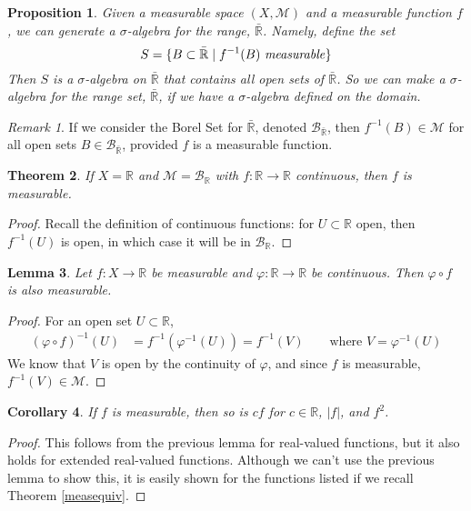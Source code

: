 \documentclass[12pt]{article}
\theoremstyle{plain}
\newtheorem{thm}{Theorem}[subsection]
\newtheorem{lem}[thm]{Lemma}
\newtheorem{prop}[thm]{Proposition}
\newtheorem{cor}[thm]{Corollary}
\theoremstyle{definition}
\theoremstyle{remark}
\newtheorem*{rmk}{Remark}
\begin{document}
\begin{prop}
Given a measurable space $(X,\mathscr{M})$ and a measurable function $f$, we can generate a $\sigma$-algebra for the range, $\bar{\mathbb{R}}$. Namely, define the set
\[
    S = \{B \subset \bar{\mathbb{R}} \; | \; f^{-1}(B) 
    \text{ \emph{measurable}} \}
\]
Then $S$ is a $\sigma$-algebra on $\bar{\mathbb{R}}$ that contains all open sets of $\bar{\mathbb{R}}$. So we can make a $\sigma$-algebra for the range set, $\bar{\mathbb{R}}$, if we have a $\sigma$-algebra defined on the domain.
\end{prop}

\begin{rmk}
If we consider the Borel Set for $\bar{\mathbb{R}}$, denoted $\mathscr{B}_{\bar{\mathbb{R}}}$, then $f^{-1}(B)\in \mathscr{M}$ for all open sets $B\in\mathscr{B}_{\bar{\mathbb{R}}}$, provided $f$ is a measurable function.
\end{rmk}

\begin{thm}
If $X=\mathbb{R}$ and $\mathscr{M}=\mathscr{B}_\mathbb{R}$ with $f:\mathbb{R}\rightarrow\mathbb{R}$ continuous, then $f$ is measurable.
\end{thm}
\begin{proof}
Recall the definition of continuous functions: for $U\subset\mathbb{R}$ open, then $f^{-1}(U)$ is open, in which case it will be in $\mathscr{B}_{\mathbb{R}}$.
\end{proof}

\begin{lem}
Let $f:X\rightarrow\mathbb{R}$ be measurable and $\varphi: \mathbb{R}\rightarrow\mathbb{R}$ be continuous. Then $\varphi\circ f$ is also measurable.
\end{lem}
\begin{proof}
For an open set $U\subset\mathbb{R}$, 
\begin{align*}
    (\varphi\circ f)^{-1}(U) &= 
        f^{-1}\left(\varphi^{-1}(U)\right)
    = f^{-1}(V) \qquad \text{where }V = \varphi^{-1}(U)
\end{align*}
We know that $V$ is open by the continuity of $\varphi$, and since $f$ is measurable, $f^{-1}(V)\in\mathscr{M}$.
\end{proof}

\begin{cor}
If $f$ is measurable, then so is $c f$ for $c\in\mathbb{R}$, $|f|$, and $f^2$. 
\end{cor}
\begin{proof}
This follows from the previous lemma for real-valued functions, but it also holds for extended real-valued functions. Although we can't use the previous lemma to show this, it is easily shown for the functions listed if we recall Theorem \ref{measequiv}.
\end{proof}
\end{document}
